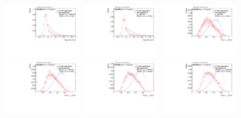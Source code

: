 \begin{figure}[H]
\includegraphics[width=0.3\textwidth]{sascha_input/Appendix/Distributions/w/distributions/beta05/h_normal_tj_D2_05_bin5.pdf} \hspace{1mm}
\includegraphics[width=0.3\textwidth]{sascha_input/Appendix/Distributions/w/distributions/beta05/h_normal_tj_D2_05_bin6.pdf}
\bigskip
\includegraphics[width=0.3\textwidth]{sascha_input/Appendix/Distributions/w/distributions/beta05/h_normal_tj_nSub21_05_bin1.pdf} \hspace{1mm}
\includegraphics[width=0.3\textwidth]{sascha_input/Appendix/Distributions/w/distributions/beta05/h_normal_tj_nSub21_05_bin2.pdf} \hspace{1mm}
\includegraphics[width=0.3\textwidth]{sascha_input/Appendix/Distributions/w/distributions/beta05/h_normal_tj_nSub21_05_bin3.pdf} 
\bigskip
\includegraphics[width=0.3\textwidth]{sascha_input/Appendix/Distributions/w/distributions/beta05/h_normal_tj_nSub21_05_bin4.pdf} \hspace{6mm}

\end{figure}
